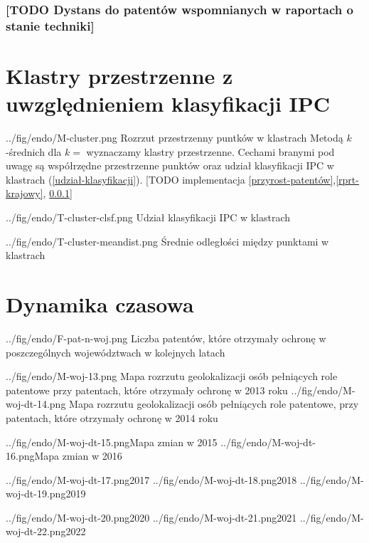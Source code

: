   \subsubsection
{[TODO Dystans do patentów wspomnianych w raportach 
  o stanie techniki]}\label{rprt-krajowy-dystans}




    \newpage\section
  {Klastry przestrzenne z uwzględnieniem klasyfikacji \ac{IPC}}

  \figside
{../fig/endo/M-cluster.png}
{Rozrzut przestrzenny puntków w klastrach}
{
Metodą $k$-średnich dla $k=$ wyznaczamy klastry przestrzenne. 
Cechami branymi pod uwagę są współrzędne przestrzenne punktów oraz
udział klasyfikacji \ac{IPC} w klastrach (\cref{udział-klasyfikacji}). 
[TODO implementacja \cref{przyrost-patentów},\cref{rprt-krajowy},
\cref{rprt-krajowy-dystans}]
}

\tblside
{../fig/endo/T-cluster-clsf.png}
{Udział klasyfikacji \ac{IPC} w klastrach}

\tblside
{../fig/endo/T-cluster-meandist.png}
{Średnie odległości między punktami w klastrach}




    \newpage\section{Dynamika czasowa}

  \figside
{../fig/endo/F-pat-n-woj.png}
{ Liczba patentów, które otrzymały ochronę w poszczególnych województwach 
  w kolejnych latach }

  \figsides
{../fig/endo/M-woj-13.png}
{ Mapa rozrzutu geolokalizacji osób pełniących role patentowe 
  przy patentach, które otrzymały ochronę w 2013 roku}
{../fig/endo/M-woj-dt-14.png}
{ Mapa rozrzutu geolokalizacji osób pełniących role patentowe, 
  przy patentach, które otrzymały ochronę w 2014 roku}

  \newpage\figsides
{../fig/endo/M-woj-dt-15.png}{Mapa zmian w 2015}
{../fig/endo/M-woj-dt-16.png}{Mapa zmian w 2016}

  \figsidesTri
{../fig/endo/M-woj-dt-17.png}{2017}
{../fig/endo/M-woj-dt-18.png}{2018}
{../fig/endo/M-woj-dt-19.png}{2019}

  \figsidesTri
{../fig/endo/M-woj-dt-20.png}{2020}
{../fig/endo/M-woj-dt-21.png}{2021}
{../fig/endo/M-woj-dt-22.png}{2022}



